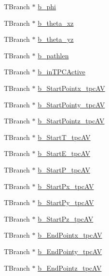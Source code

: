 \begin{DoxyCompactItemize}
\item 
T\-Branch $\ast$ \hyperlink{classanatree_a785b0dfe81115f9cbf571b545d26ca88}{b\-\_\-phi}
\item 
T\-Branch $\ast$ \hyperlink{classanatree_a02d9381d25c3a77920329c803c423029}{b\-\_\-theta\-\_\-xz}
\item 
T\-Branch $\ast$ \hyperlink{classanatree_ad1cfdc33d1d125978746c0e4d4fb5679}{b\-\_\-theta\-\_\-yz}
\item 
T\-Branch $\ast$ \hyperlink{classanatree_ab602eac75025e59ccd47ca64ef07a558}{b\-\_\-pathlen}
\item 
T\-Branch $\ast$ \hyperlink{classanatree_aca9ed320bee9d0643e5da420f55e9681}{b\-\_\-in\-T\-P\-C\-Active}
\item 
T\-Branch $\ast$ \hyperlink{classanatree_a39a6d6068132509f343539aeeb53dd6f}{b\-\_\-\-Start\-Pointx\-\_\-tpc\-A\-V}
\item 
T\-Branch $\ast$ \hyperlink{classanatree_a8187437d9bcecf12e826a215dadee1fe}{b\-\_\-\-Start\-Pointy\-\_\-tpc\-A\-V}
\item 
T\-Branch $\ast$ \hyperlink{classanatree_aff26c16883d4af1e52829ef6729925ee}{b\-\_\-\-Start\-Pointz\-\_\-tpc\-A\-V}
\item 
T\-Branch $\ast$ \hyperlink{classanatree_ab314692ec0ba05ed5c3a529129d85777}{b\-\_\-\-Start\-T\-\_\-tpc\-A\-V}
\item 
T\-Branch $\ast$ \hyperlink{classanatree_ad5cbd53ea587b39df210918c4ae78309}{b\-\_\-\-Start\-E\-\_\-tpc\-A\-V}
\item 
T\-Branch $\ast$ \hyperlink{classanatree_aee754e1c862c439707739f665c0ad321}{b\-\_\-\-Start\-P\-\_\-tpc\-A\-V}
\item 
T\-Branch $\ast$ \hyperlink{classanatree_a2535d5d8b75d3c6adba23207708ffe31}{b\-\_\-\-Start\-Px\-\_\-tpc\-A\-V}
\item 
T\-Branch $\ast$ \hyperlink{classanatree_a4cf7771810d042b4c5417a2624a2d266}{b\-\_\-\-Start\-Py\-\_\-tpc\-A\-V}
\item 
T\-Branch $\ast$ \hyperlink{classanatree_a49262af6a270051a737f05a7d84ee343}{b\-\_\-\-Start\-Pz\-\_\-tpc\-A\-V}
\item 
T\-Branch $\ast$ \hyperlink{classanatree_a4e6d9004d80bf7ac8e45795bef1593ab}{b\-\_\-\-End\-Pointx\-\_\-tpc\-A\-V}
\item 
T\-Branch $\ast$ \hyperlink{classanatree_a4728f465c7867757087d2ec96d2a93bf}{b\-\_\-\-End\-Pointy\-\_\-tpc\-A\-V}
\item 
T\-Branch $\ast$ \hyperlink{classanatree_a55f7afc2c736633d60116620d8cac30b}{b\-\_\-\-End\-Pointz\-\_\-tpc\-A\-V}

\end{DoxyCompactItemize}
